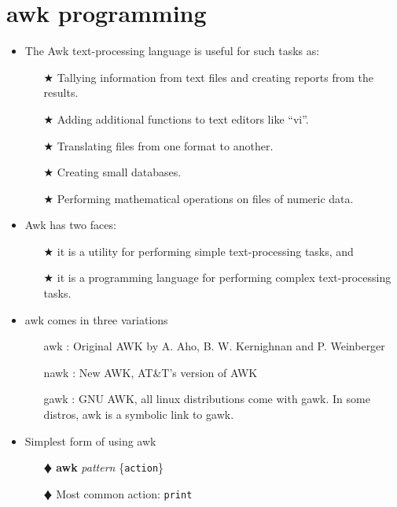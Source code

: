 \documentclass[10pt,t]{beamer}
\begin{document}
\section{awk programming}
\begin{frame}
  \begin{itemize}
    \item The Awk text-processing language is useful for such tasks as:
    \begin{enumerate}
      \item[$\bigstar$] Tallying information from text files and creating reports from the results.
      \item[$\bigstar$]Adding additional functions to text editors like ``vi''.
      \item[$\bigstar$] Translating files from one format to another.
      \item[$\bigstar$] Creating small databases.
      \item[$\bigstar$]Performing mathematical operations on files of numeric data.
    \end{enumerate}
    \item Awk has two faces: 
    \begin{enumerate}
      \item[$\bigstar$] it is a utility for performing simple text-processing tasks, and 
      \item[$\bigstar$] it is a programming language for performing complex text-processing tasks.
    \end{enumerate}
    \item awk comes in three variations
    \begin{enumerate}
        \item[awk]: Original AWK by A. Aho, B. W. Kernighnan and P. Weinberger
        \item[nawk]: New AWK, AT\&T's version of AWK
        \item[gawk]: GNU AWK, all linux distributions come with gawk. In some distros, awk is a symbolic link to gawk.
    \end{enumerate}
    \item Simplest form of using awk
    \begin{enumerate}
      \item[$\vardiamond$]\textbf{awk} \textit{pattern} \{\texttt{action}\}
      \item[$\vardiamond$] Most common action: \texttt{print}

\end{enumerate}
\end{itemize}
\end{frame}
\end{document}

